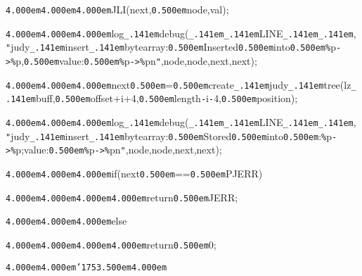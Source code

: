 \noindent
{}\hfill

\noindent
{}{\tt\mc \kern4.000em}{\tt\mc \kern4.000em}{\tt\mc \kern4.000em}JLI(next,{\tt\mc \kern0.500em}{\tt *}node,val);

\noindent
{}\hfill

\noindent
{}{\tt\mc \kern4.000em}{\tt\mc \kern4.000em}{\tt\mc \kern4.000em}log{\tt\_\kern.141em}debug({\tt\_\kern.141em}{\tt\_\kern.141em}LINE{\tt\_\kern.141em}{\tt\_\kern.141em},{\tt "}judy{\tt\_\kern.141em}insert{\tt\_\kern.141em}bytearray:{\tt\mc \kern0.500em}Inserted{\tt\mc \kern0.500em}into{\tt\mc \kern0.500em}{\tt\%}p{\tt -}{\tt >}{\tt\%}p,{\tt\mc \kern0.500em}value:{\tt\mc \kern0.500em}{\tt\%}p{\tt -}{\tt >}{\tt\%}p{\tt{}}n{\tt "},node,{\tt *}node,next,{\tt *}next);

\noindent
{}\hfill

\noindent
{}{\tt\mc \kern4.000em}{\tt\mc \kern4.000em}{\tt\mc \kern4.000em}{\tt *}next{\tt\mc \kern0.500em}={\tt\mc \kern0.500em}create{\tt\_\kern.141em}judy{\tt\_\kern.141em}tree(lz{\tt\_\kern.141em}buff,{\tt\mc \kern0.500em}offset+i+4,{\tt\mc \kern0.500em}length{\tt -}i{\tt -}4,{\tt\mc \kern0.500em}position);

\noindent
{}\hfill

\noindent
{}{\tt\mc \kern4.000em}{\tt\mc \kern4.000em}{\tt\mc \kern4.000em}log{\tt\_\kern.141em}debug({\tt\_\kern.141em}{\tt\_\kern.141em}LINE{\tt\_\kern.141em}{\tt\_\kern.141em},{\tt "}judy{\tt\_\kern.141em}insert{\tt\_\kern.141em}bytearray:{\tt\mc \kern0.500em}Stored{\tt\mc \kern0.500em}into{\tt\mc \kern0.500em}:{\tt\%}p{\tt -}{\tt >}{\tt\%}p;value:{\tt\mc \kern0.500em}{\tt\%}p{\tt -}{\tt >}{\tt\%}p{\tt{}}n{\tt "},node,{\tt *}node,next,{\tt *}next);

\noindent
{}\hfill

\noindent
{}{\tt\mc \kern4.000em}{\tt\mc \kern4.000em}{\tt\mc \kern4.000em}if({\tt *}next{\tt\mc \kern0.500em}=={\tt\mc \kern0.500em}PJERR)

\noindent
{}{\tt\mc \kern4.000em}{\tt\mc \kern4.000em}{\tt\mc \kern4.000em}{\tt\mc \kern4.000em}return{\tt\mc \kern0.500em}JERR;

\noindent
{}{\tt\mc \kern4.000em}{\tt\mc \kern4.000em}{\tt\mc \kern4.000em}else

\noindent
{}{\tt\mc \kern4.000em}{\tt\mc \kern4.000em}{\tt\mc \kern4.000em}{\tt\mc \kern4.000em}return{\tt\mc \kern0.500em}0;

\noindent
{}{\tt\mc \kern4.000em}{\tt\mc \kern4.000em}{\tt\char'175}{\tt\mc \kern3.500em}{\tt\mc \kern4.000em}

